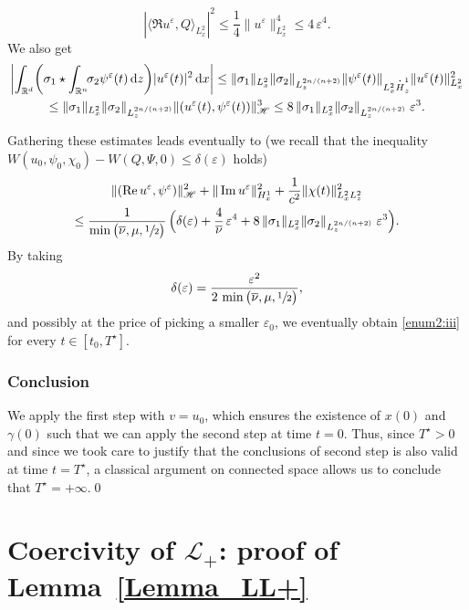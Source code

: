\documentclass[11pt]{article}
\let\oldbar\bar\let\oldhat\hat\let\oldtilde\tilde
\let\bar\oldbar
\let\hat\oldhat
\let\tilde\oldtilde
\DeclareRobustCommand{\accentset}[2]{\overset{#1}{#2}}
\theoremstyle{definition}
\newcommand*{\overbigdot}[1]{%
\accentset{\mbox{\large\bfseries .}}{#1}}
\let\bar\overline
\let\hat\widehat
\let\tilde\widetilde
\newcommand{\R}{\mathbb{R}}
\newcommand{\ud}{\, {\mathrm{d}}}
\begin{document}
\[
\left|\langle \Re u^{\varepsilon},Q\rangle_{L_{x}^{2}}\right|^{2}\leq\frac{1}{4}\|u^{\varepsilon}\|_{L_{x}^{2}}^{4}\leq 4\,\varepsilon^{4}.
\]
We also get
\bgroup
{}
\begin{multline*}
\left|\int_{\R^{d}}\biggl(\sigma_{1}\star\int_{\R^{n}}\!\!\sigma_{2}\psi^{\varepsilon}(t)\ud z\biggr)|u^{\varepsilon}(t)|^{2}\ud x\right|\leq\|\sigma_{1}\|_{L_{x}^{2}}\|\sigma_{2}\|_{L_{z}^{2n/(n+2)}}\|\psi^{\varepsilon}(t)\|_{L_{x}^{2}\overbigdot{H}_{z}^{1}}\|u^{\varepsilon}(t)\|_{L_{x}^{2}}^{2}\\
\leq\|\sigma_{1}\|_{L_{x}^{2}}\|\sigma_{2}\|_{L_{z}^{2n/(n+2)}}\|(u^{\varepsilon}(t),\psi^{\varepsilon}(t))\|_{\mathscr{H}}^{3}\leq 8\,\|\sigma_{1}\|_{L_{x}^{2}}\|\sigma_{2}\|_{L_{z}^{2n/(n+2)}}\;\varepsilon^{3}.
\end{multline*}
\egroup

Gathering these estimates leads eventually to (we recall that the inequality $W(u_{0},\psi_{0},\chi_{0})-W(Q,\Psi,0)\leq\delta(\varepsilon)$ holds)
\begin{multline*}
\|(\Re u^{\varepsilon},\psi^{\varepsilon})\|_{\mathscr{H}}^{2}+\|\Im u^{\varepsilon}\|_{H_{x}^{1}}^{2}+\frac{1}{c^{2}}\|\chi(t)\|_{L_{x}^{2}L_{z}^{2}}^{2}\\
\leq\frac{1}{\min\big(\bar{\nu},\mu,\sfrac{1}{2}\big)}\,\Bigl(\delta(\varepsilon)+\frac{4}{\bar{\nu}}\,\varepsilon^{4}+8\,\|\sigma_{1}\|_{L_{x}^{2}}\|\sigma_{2}\|_{L_{z}^{2n/(n+2)}}\;\varepsilon^{3}\Bigr).
\end{multline*}
By taking
\[
\delta(\varepsilon)=\frac{\varepsilon^{2}}{2\,\min\big(\bar{\nu},\mu,\sfrac{1}{2}\big)},
\]
and possibly at the price of picking a smaller $\varepsilon_{0}$, we eventually obtain \eqref{enum2:iii} for every $t\in[t_{0},T^{\star}]$.

\subsubsection*{Conclusion} We apply the first step with $v=u_{0}$, which ensures the existence of $x(0)$ and $\gamma(0)$ such that we can apply the second step at time $t=0$. Thus, since $T^{\star}>0$ and since we took care to justify that the conclusions of second step is also valid at time $t=T^{\star}$, a classical argument on connected space allows us to conclude that $T^{\star}=+\infty$.\qed

\section{Coercivity of \texorpdfstring{$\mathcal{L}_{+}$}{L}: proof of Lemma~\ref{Lemma_LL+}}\label{Proof_Lemma_LL+}
\end{document}
